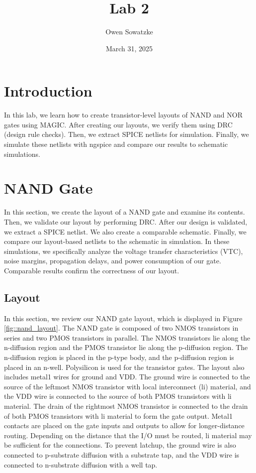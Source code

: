 \documentclass{article}
\title{Lab 2}
\author{Owen Sowatzke}
\date{March 31, 2025}
\newcommand{\zerodisplayskip}{
	\setlength{\abovedisplayskip}{0pt}%
	\setlength{\belowdisplayskip}{0pt}%
	\setlength{\abovedisplayshortskip}{0pt}%
	\setlength{\belowdisplayshortskip}{0pt}%
	\setlength{\mathindent}{0pt}}
\begin{document}
	\maketitle
	
	\section{Introduction}
	
	In this lab, we learn how to create transistor-level layouts of NAND and NOR gates using MAGIC. After creating our layouts, we verify them using DRC (design rule checks). Then, we extract SPICE netlists for simulation. Finally, we simulate these netlists with ngspice and compare our results to schematic simulations. 
	
	\section{NAND Gate}
	
	In this section, we create the layout of a NAND gate and examine its contents. Then, we validate our layout by performing DRC. After our design is validated, we extract a SPICE netlist. We also create a comparable schematic. Finally, we compare our layout-based netlists to the schematic in simulation. In these simulations, we specifically analyze the voltage transfer characteristics (VTC), noise margins, propagation delays, and power consumption of our gate. Comparable results confirm the correctness of our layout.
	
	\subsection{Layout}
	
	In this section, we review our NAND gate layout, which is displayed in Figure \ref{fig::nand_layout}. The NAND gate is composed of two NMOS transistors in series and two PMOS transistors in parallel. The NMOS transistors lie along the n-diffusion region and the PMOS transistor lie along the p-diffusion region. The n-diffusion region is placed in the p-type body, and the p-diffusion region is placed in an n-well. Polysilicon is used for the transistor gates. The layout also includes metal1 wires for ground and VDD. The ground wire is connected to the source of the leftmost NMOS transistor with local interconnect (li) material, and the VDD wire is connected to the source of both PMOS transistors with li material. The drain of the rightmost NMOS transistor is connected to the drain of both PMOS transistors with li material to form the gate output. Metal1 contacts are placed on the gate inputs and outputs to allow for longer-distance routing. Depending on the distance that the I/O must be routed, li material may be sufficient for the connections. To prevent latchup, the ground wire is also connected to p-substrate diffusion with a substrate tap, and the VDD wire is connected to n-substrate diffusion with a well tap.
	
\end{document}
